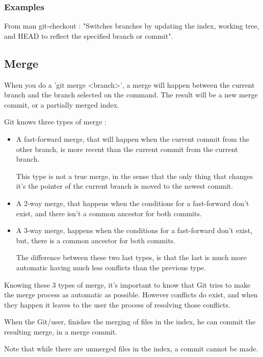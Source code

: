 \subsubsection{Examples}
From man git-checkout : "Switches branches by updating the index, 
working tree, and HEAD to reflect the specified branch or commit". \par

\subsection{Merge}


When you do a 'git merge <branch>', a merge will happen between the current
branch and the branch selected on the command. The result will be a new merge 
commit, or a partially merged index. \par

Git knows three types of merge : 
\begin{itemize}
\item A fast-forward merge, that will happen when 
the current commit from the other
branch, is more recent than the current commit from the current branch. \par
This type is not a true merge, in the sense that the only thing that
changes it's the pointer of the current branch
is moved to the newest commit.

\item A 2-way merge, that happens when the conditions for a fast-forward
don't exist, and there isn't a common ancestor for both commits.

\item A 3-way merge, happens when the conditions for a fast-forward
don't exist, but, there is a common ancestor for both commits. \par
The difference between these two last types, is that the last is much 
more automatic having much less conflicts than the previous type.
\end{itemize}
Knowing these 3 types of merge, it's important to know that Git tries to make
the merge process as automatic as possible. However conflicts do exist, and when
they happen it leaves to the user the process of resolving those conflicts. \par
When the Git/user, finishes the merging of files in the index, he
can commit the resulting merge, in a merge commit. \par
Note that while there are unmerged files in the index, a commit cannot be
made. \par 

